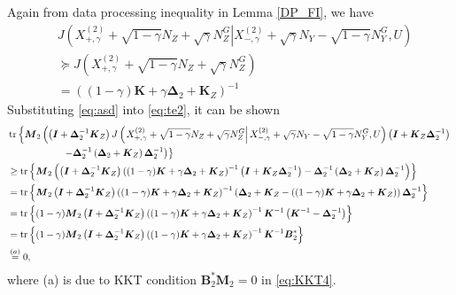 \documentclass[journal,final, onecolumn]{IEEEtran}
\DeclareMathOperator{\tr}{tr}
\begin{document}
Again from data processing inequality in Lemma \ref{DP_FI}, we have
\begin{align}
& J\left( \left.X^{(2)}_{+, \gamma}+\sqrt{1-\gamma}N_{Z}+ \sqrt{\gamma}N_{Z}^{G} \right|X^{(2)}_{-, \gamma}+\sqrt{\gamma}N_{Y} - \sqrt{1-\gamma}N_{Y}^{G}, U \right)\nonumber \\
& \succeq J\left( \left.X^{(2)}_{+, \gamma}+\sqrt{1-\gamma}N_{Z}+ \sqrt{\gamma}N_{Z}^{G} \right.  \right)\\
&=\left((1-\gamma)\boldsymbol{K} + \gamma \boldsymbol{\Delta}_{2} + \boldsymbol{K}_{Z} \right)^{-1} \label{eq:asd}
\end{align}
Substituting \eqref{eq:asd} into \eqref{eq:te2}, it can be shown
\begin{align}
& \tr \left\{   \boldsymbol{M}_{2}\left(\left( \boldsymbol{I} + \boldsymbol{\Delta}^{-1}_{2}\boldsymbol{K}_{Z}  \right)J\left( \left.X^{(2)}_{+, \gamma}+\sqrt{1-\gamma}N_{Z}+ \sqrt{\gamma}N_{Z}^{G} \right|X^{(2)}_{-, \gamma}+\sqrt{\gamma}N_{Y} - \sqrt{1-\gamma}N_{Y}^{G}, U \right)\left( \boldsymbol{I} + \boldsymbol{K}_{Z}\boldsymbol{\Delta}^{-1}_{2}  \right)\right.\right.\nonumber \\
& \hspace{0.5in} \qquad   \left.\left.-\boldsymbol{\Delta}_{2}^{-1}\left( \boldsymbol{\Delta}_{2} + \boldsymbol{K}_{Z}  \right)\boldsymbol{\Delta}_{2}^{-1} \right)        \right\} \nonumber \\
& \geq \tr \left\{   \boldsymbol{M}_{2}\left(\left( \boldsymbol{I} + \boldsymbol{\Delta}^{-1}_{2}\boldsymbol{K}_{Z}  \right) \left((1-\gamma)\boldsymbol{K} + \gamma \boldsymbol{\Delta}_{2} + \boldsymbol{K}_{Z} \right)^{-1}\left( \boldsymbol{I} + \boldsymbol{K}_{Z}\boldsymbol{\Delta}^{-1}_{2}  \right)-\boldsymbol{\Delta}_{2}^{-1}\left( \boldsymbol{\Delta}_{2} + \boldsymbol{K}_{Z}  \right)\boldsymbol{\Delta}_{2}^{-1} \right)        \right\} \\
&=\tr \left\{   \boldsymbol{M}_{2}\left( \boldsymbol{I} + \boldsymbol{\Delta}^{-1}_{2}\boldsymbol{K}_{Z}  \right) \left((1-\gamma)\boldsymbol{K} + \gamma \boldsymbol{\Delta}_{2} + \boldsymbol{K}_{Z} \right)^{-1}
 \left( \boldsymbol{\Delta}_{2} + \boldsymbol{K}_{Z} - \left( (1-\gamma)\boldsymbol{K} + \gamma \boldsymbol{\Delta}_{2} + \boldsymbol{K}_{Z}\right)       \right) \boldsymbol{\Delta}_{2}^{-1}        \right\}\\
 &=\tr \left\{  (1-\gamma) \boldsymbol{M}_{2}\left( \boldsymbol{I} + \boldsymbol{\Delta}^{-1}_{2}\boldsymbol{K}_{Z}  \right) \left((1-\gamma)\boldsymbol{K} + \gamma \boldsymbol{\Delta}_{2} + \boldsymbol{K}_{Z} \right)^{-1}\boldsymbol{K}^{-1}
 \left(  \boldsymbol{K}^{-1} - \boldsymbol{\Delta}_{2}^{-1}    \right)        \right\}\\
 &=\tr \left\{  (1-\gamma) \boldsymbol{M}_{2}\left( \boldsymbol{I} + \boldsymbol{\Delta}^{-1}_{2}\boldsymbol{K}_{Z}  \right) \left((1-\gamma)\boldsymbol{K} + \gamma \boldsymbol{\Delta}_{2} + \boldsymbol{K}_{Z} \right)^{-1}\boldsymbol{K}^{-1}
 \boldsymbol{B}^{*}_{2}  \right\}\\
 &\overset{(a)}=0,\label{eq:tter2}
\end{align}
where (a) is due to KKT condition $\boldsymbol{B}_{2}^{*} \boldsymbol{M}_{2}=0$ in \eqref{eq:KKT4}.
\end{document}
